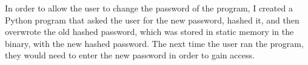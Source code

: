 \documentclass[conference]{IEEEtran}
\begin{document}
In order to allow the user to change the password of the program, I created a Python program that asked the user for the new password, hashed it, and then overwrote the old hashed password, which was stored in static memory in the binary, with the new hashed password. The next time the user ran the program, they would need to enter the new password in order to gain access.\\\\

\printbibliography

%
\IEEEpeerreviewmaketitle


\end{document}
